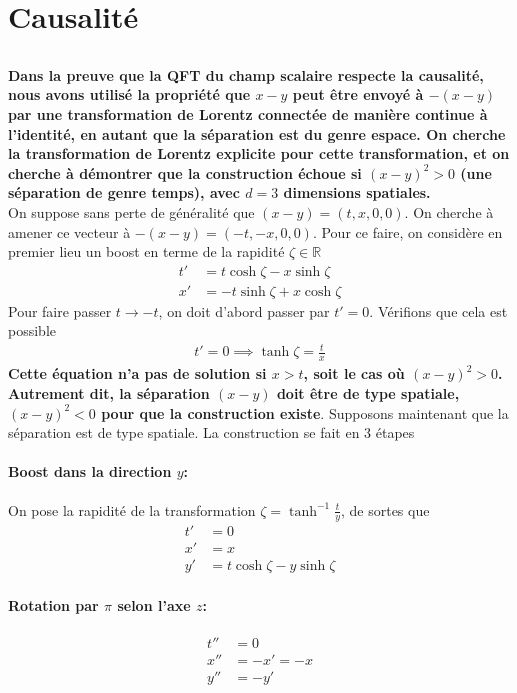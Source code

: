 \documentclass{article}
\numberwithin{equation}{section}
\begin{document}
\section{Causalité}
\subsection{}
\textbf{Dans la preuve que la QFT du champ scalaire respecte la causalité, nous avons utilisé la propriété que $x - y$ peut être envoyé à $- (x -  y)$ par une transformation de Lorentz 
connectée de manière continue à l’identité, en autant que la séparation est du genre espace.
On cherche la transformation de Lorentz explicite pour cette transformation, et on cherche à 
démontrer que la construction échoue si $(x - y)^{2} > 0$ (une séparation de genre temps), avec $d=3$ dimensions spatiales.}\\

On suppose sans perte de généralité que $(x - y) = (t, x, 0, 0)$. On cherche à amener ce vecteur à $-(x - y) =(-t, -x, 0, 0)$. 
Pour ce faire, on considère en premier lieu un boost en terme de la rapidité $\zeta \in \mathbb{R}$
\begin{align}
        t' &= t \cosh \zeta - x \sinh \zeta \\
        x' &= -t \sinh \zeta + x\cosh \zeta
\end{align}
Pour faire passer $t \rightarrow -t$, on doit d'abord passer par $t' = 0$. Vérifions que cela est possible
\begin{align*}
       t' = 0 \implies \tanh \zeta = \frac{t}{x} 
\end{align*}
\textbf{Cette équation n'a pas de solution si $x > t$, soit le cas où $(x - y)^2 > 0$. 
Autrement dit, la séparation $(x - y)$ doit être de type spatiale, $(x - y)^2 < 0$ pour que 
la construction existe}. Supposons maintenant que la séparation est de type spatiale. La construction se fait en 3 étapes
\paragraph{Boost dans la direction $y$:} On pose la rapidité de la transformation $\zeta = \tanh^{-1}\frac{t}{y}$, de sortes que
\begin{align*}
        t' &= 0 \\
        x' &= x \\
        y' &= t \cosh \zeta - y \sinh \zeta
\end{align*}
\paragraph{Rotation par $\pi$ selon l'axe $z$:} 
\begin{align*}
        t'' &= 0 \\
        x'' &= -x' = -x \\
        y'' &= -y'
\end{align*}
\end{document}
